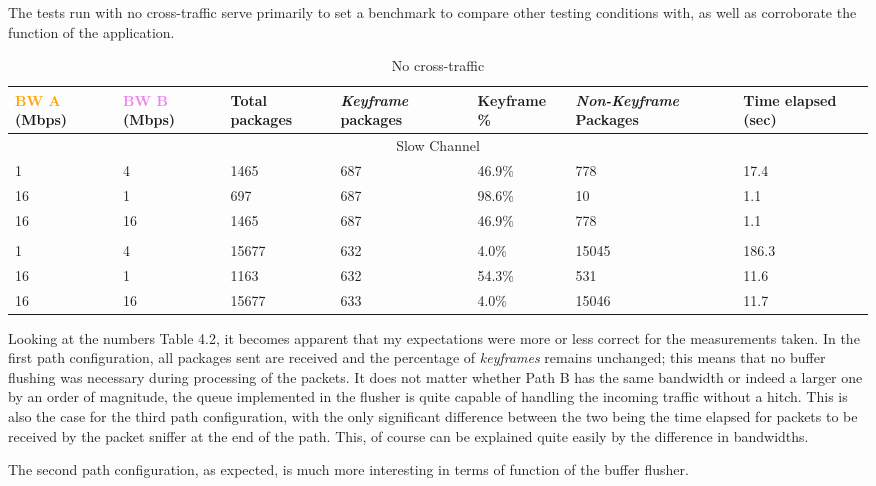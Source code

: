 The tests run with no cross-traffic serve primarily to set a benchmark to compare other testing conditions with, as well as corroborate the function of the application. 

\begin{table}[htbp]
\break
\setlength{\arrayrulewidth}{1mm}
\setlength{\tabcolsep}{12pt}
\renewcommand{\arraystretch}{1.5}
 {
\begin{tabular}{ |p{1.375cm}|p{1.375cm}|p{1.25cm}|p{1.5cm}|p{1.5cm}|p{1.75cm}|p{1.5cm}| }
\hline
\textcolor{orange}{BW A} (Mbps)&\textcolor{violet}{BW B} (Mbps)& Total packages & \textit{Keyframe} packages & Keyframe \% & \textit{Non-Keyframe} Packages & Time elapsed (sec) \\
\hline
\multicolumn{7}{|c|}{Slow Channel} \\
\hline
1&4&1465&687&46.9\%&778&17.4\\
16&1&697&687&98.6\%&10&1.1\\
16&16&1465&687&46.9\%&778&1.1\\
\hline
\rowcolor{white}\multicolumn{7}{|c|}{Medium Channel} \\
\hline
1&4&15677&632&4.0\%&15045&186.3\\
16&1&1163&632&54.3\%&531&11.6\\
16&16&15677&633&4.0\%&15046&11.7\\
\hline
\end{tabular}
}
\caption{No cross-traffic}
\end{table}

Looking at the numbers Table 4.2, it becomes apparent that my expectations were more or less correct for the measurements taken. In the first path configuration, all packages sent are received and the percentage of \textit{keyframes} remains unchanged; this means that no buffer flushing was necessary during processing of the packets. It does not matter whether Path B has the same bandwidth or indeed a larger one by an order of magnitude, the queue implemented in the flusher is quite capable of handling the incoming traffic without a hitch. This is also the case for the third path configuration, with the only significant difference between the two being the time elapsed for packets to be received by the packet sniffer at the end of the path. This, of course can be explained quite easily by the difference in bandwidths.

The second path configuration, as expected, is much more interesting in terms of function of the buffer flusher.

